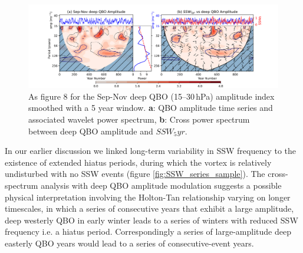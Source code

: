 
\begin{center}
\begin{figure}[h!]
\includegraphics[width = \textwidth]{Figures/Figures-origins/deep_QBO_amp_wavelet_combined.png}
\caption[Wavelet and cross spectra for the deep QBO amplitude in UKESM.]{As figure 8 for the Sep-Nov deep QBO (15--30\,hPa) amplitude index smoothed with a 5 year window. \textbf{a}: QBO amplitude time series and associated wavelet power spectrum, \textbf{b}: Cross power spectrum between deep QBO amplitude and $SSW_5yr$.}
\label{fig:QBO_SSW_subfig}
\end{figure}
\end{center}



In our earlier discussion we linked long-term variability in SSW frequency to the existence of extended hiatus periods, during which the vortex is relatively undisturbed with no SSW events (figure \ref{fig:SSW_series_sample}). The cross-spectrum analysis with deep QBO amplitude modulation suggests a possible physical interpretation involving the Holton-Tan relationship varying on longer timescales, in which a series of consecutive years that exhibit a large amplitude, deep westerly QBO in early winter leads to a series of winters with reduced SSW frequency i.e. a hiatus period. Correspondingly a series of large-amplitude deep easterly QBO years would lead to a series of consecutive-event years.

